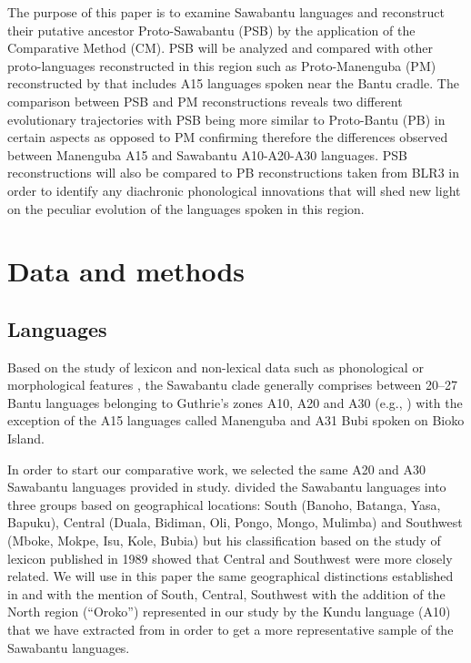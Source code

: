 \documentclass[output=paper,colorlinks,citecolor=brown
]{langscibook}
\begin{document}
The purpose of this paper is to examine Sawabantu languages and reconstruct their putative ancestor Proto-Sawabantu (PSB) by the application of the Comparative Method (CM). PSB will be analyzed and compared with other proto-languages reconstructed in this region such as Proto-Manenguba (PM) reconstructed by \citet{hedinger1987} that includes A15 languages spoken near the Bantu cradle. The comparison between PSB and PM reconstructions reveals two different evolutionary trajectories with PSB being more similar to Proto-Bantu (PB) in certain aspects as opposed to PM confirming therefore the differences observed between Manenguba A15 and Sawabantu A10-A20-A30 languages. PSB reconstructions will also be compared to PB reconstructions taken from BLR3 \citep{bastinetal2002} in order to identify any diachronic phonological innovations that will shed new light on the peculiar evolution of the languages spoken in this region. 

\section{Data and methods} \label{sect:grollemundbrownrule:dataandmethods}

\subsection{Languages} \label{sect:grollemundbrownrule:languages} 

Based on the study of lexicon \citep{ebobisse1989, ebobisse2015} and non-lexical data such as phonological or morphological features \citep[70]{nurseandphilippson2003}, the Sawabantu clade generally comprises between 20--27 Bantu languages belonging to Guthrie’s zones A10, A20 and A30 (e.g., ) with the exception of the A15 languages called Manenguba and A31 Bubi spoken on Bioko Island. 

In order to start our comparative work, we selected the same A20 and A30 Sawabantu languages provided in \citet{ebobisse2015} study. \citet{ebobisse2015} divided the Sawabantu languages into three groups based on geographical locations: South (Banoho, Batanga, Yasa, Bapuku), Central (Duala, Bidiman, Oli, Pongo, Mongo, Mulimba) and Southwest (Mboke, Mokpe, Isu, Kole, Bubia) but his classification based on the study of lexicon published in 1989 showed that Central and Southwest were more closely related. We will use in this paper the same geographical distinctions established in \citet{ebobisse1989} and \citet{ebobisse2015} with the mention of South, Central, Southwest with the addition of the North region (“Oroko”) represented in our study by the Kundu language (A10) that we have extracted from \citet{friesen2002} in order to get a more representative sample of the Sawabantu languages.
\end{document}
